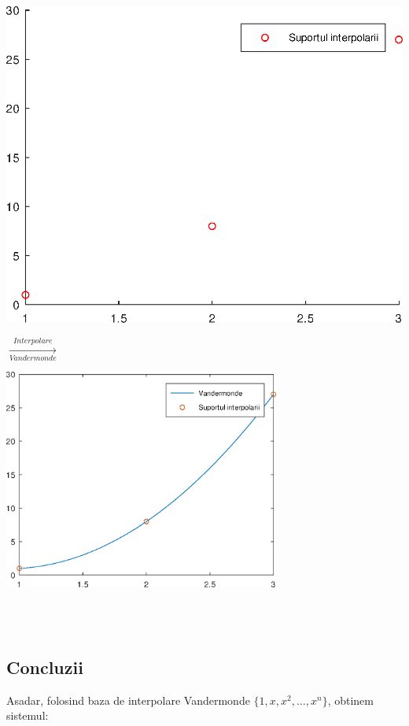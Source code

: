 \documentclass{article}
\begin{document}
\begin{minipage}{0.4\textwidth}
    \includegraphics[width=1\textwidth]{scatter_ex}
\end{minipage}
{\LARGE$\xrightarrow[Vandermonde]{Interpolare}$}\;\;
\begin{minipage}{0.6\textwidth}
    \includegraphics[width=0.68\textwidth]{vandermonde_ex}
\end{minipage}\\\\


\subsection{Concluzii}
\tab Asadar, folosind baza de interpolare Vandermonde $\{1, x, x^2, \dots, x^n\}$, obtinem sistemul:
\end{document}
